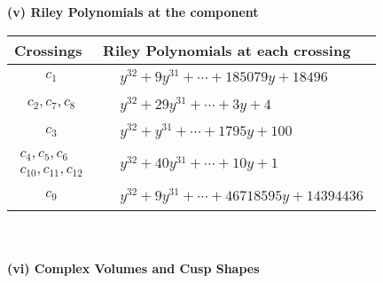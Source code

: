 \documentclass[1p]{elsarticle_modified}
\theoremstyle{definition}
\begin{document}
\newpage\renewcommand{\arraystretch}{1}
\flushleft \textbf{(v) Riley Polynomials at the component}\newline \\
\begin{tabular}{m{50pt}|m{274pt}}
Crossings & \hspace{64pt}Riley Polynomials at each crossing \\
\hline $$\begin{aligned}c_{1}\end{aligned}$$&$\begin{aligned}
&y^{32}+9 y^{31}+\cdots+185079 y+18496
\end{aligned}$\\
\hline $$\begin{aligned}c_{2},c_{7},c_{8}\end{aligned}$$&$\begin{aligned}
&y^{32}+29 y^{31}+\cdots+3 y+4
\end{aligned}$\\
\hline $$\begin{aligned}c_{3}\end{aligned}$$&$\begin{aligned}
&y^{32}+y^{31}+\cdots+1795 y+100
\end{aligned}$\\
\hline $$\begin{aligned}c_{4},c_{5},c_{6}\\c_{10},c_{11},c_{12}\end{aligned}$$&$\begin{aligned}
&y^{32}+40 y^{31}+\cdots+10 y+1
\end{aligned}$\\
\hline $$\begin{aligned}c_{9}\end{aligned}$$&$\begin{aligned}
&y^{32}+9 y^{31}+\cdots+46718595 y+14394436
\end{aligned}$\\
\hline
\end{tabular}\\~\\
\newpage\flushleft \textbf{(vi) Complex Volumes and Cusp Shapes}
\end{document}
